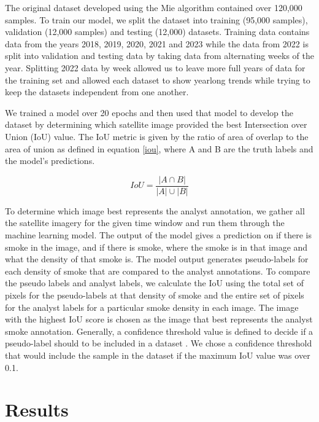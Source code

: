 \documentclass{ametsocV6.1}
\begin{document}
The original dataset developed using the Mie algorithm contained over 120,000 samples. To train our model, we split the dataset into training (95,000 samples), validation (12,000 samples) and testing (12,000) datasets. Training data contains data from the years 2018, 2019, 2020, 2021 and 2023 while the data from 2022 is split into validation and testing data by taking data from alternating weeks of the year. Splitting 2022 data by week allowed us to leave more full years of data for the training set and allowed each dataset to show yearlong trends while trying to keep the datasets independent from one another.

We trained a model over 20 epochs and then used that model to develop the dataset by determining which satellite image provided the best Intersection over Union (IoU) value. The IoU metric is given by the ratio of area of overlap to the area of union as defined in equation \ref{iou}, where A and B are the truth labels and the model's predictions.

\begin{equation} \label{iou}
    IoU = \frac{| A \cap B|}{|A|\cup|B|}
\end{equation}

To determine which image best represents the analyst annotation, we gather all the satellite imagery for the given time window and run them through the machine learning model. The output of the model gives a prediction on if there is smoke in the image, and if there is smoke, where the smoke is in that image and what the density of that smoke is. The model output generates pseudo-labels for each density of smoke that are compared to the analyst annotations. To compare the pseudo labels and analyst labels, we calculate the IoU using the total set of pixels for the pseudo-labels at that density of smoke and the entire set of pixels for the analyst labels for a particular smoke density in each image. The image with the highest IoU score is chosen as the image that best represents the analyst smoke annotation. Generally, a confidence threshold value is defined to decide if a pseudo-label should to be included in a dataset \citep{conf_thresh}. We chose a confidence threshold that would include the sample in the dataset if the maximum IoU value was over 0.1.



\section*{Results}
\end{document}
